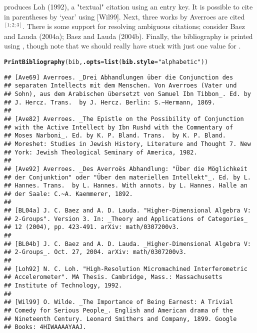 \documentclass[article]{jss}\usepackage[]{graphicx}\usepackage[]{color}
\makeatletter
\newcommand{\hlstr}[1]{\textcolor[rgb]{0.125,0.125,1}{#1}}%
\newcommand{\hlstd}[1]{\textcolor[rgb]{0.251,0.251,0.282}{#1}}%
\newcommand{\hlkwc}[1]{\textcolor[rgb]{0.529,0,0.184}{\textbf{#1}}}%
\newcommand{\hlkwd}[1]{\textcolor[rgb]{0.251,0.251,0.282}{\textbf{#1}}}%
\newenvironment{kframe}{%
 \def\at@end@of@kframe{}%
 \ifinner\ifhmode%
  \def\at@end@of@kframe{\end{minipage}}%
  \begin{minipage}{\columnwidth}%
 \fi\fi%
 \def\FrameCommand##1{\hskip\@totalleftmargin \hskip-\fboxsep
 \colorbox{shadecolor}{##1}\hskip-\fboxsep
     \hskip-\linewidth \hskip-\@totalleftmargin \hskip\columnwidth}%
 \MakeFramed {\advance\hsize-\width
   \@totalleftmargin\z@ \linewidth\hsize
   \@setminipage}}%
 {\par\unskip\endMakeFramed%
 \at@end@of@kframe}
\newenvironment{knitrout}{}{} %
\makeatother
\begin{document}
 produces Loh (1992), a "textual" citation using an entry key.  It is possible to cite in parentheses by `year' using  [Wil99].  Next, three works by Averroes are cited  $^{[1; 2; 3]}$.  There is some support for resolving ambiguous citations; consider  Baez and Lauda (2004a); Baez and Lauda (2004b).  Finally, the bibliography is printed using , though note that we should really have stuck with just one value for .
\begin{knitrout}
\color{fgcolor}\begin{kframe}
\begin{alltt}
\hlkwd{PrintBibliography}\hlstd{(bib,} \hlkwc{.opts} \hlstd{=} \hlkwd{list}\hlstd{(}\hlkwc{bib.style} \hlstd{=} \hlstr{"alphabetic"}\hlstd{))}
\end{alltt}
\begin{verbatim}
## [Ave69] Averroes. _Drei Abhandlungen über die Conjunction des
## separaten Intellects mit dem Menschen. Von Averroes (Vater und
## Sohn), aus dem Arabischen übersetzt von Samuel Ibn Tibbon_. Ed. by
## J. Hercz. Trans.  by J. Hercz. Berlin: S.~Hermann, 1869.
## 
## [Ave82] Averroes. _The Epistle on the Possibility of Conjunction
## with the Active Intellect by Ibn Rushd with the Commentary of
## Moses Narboni_. Ed. by K. P. Bland. Trans.  by K. P. Bland.
## Moreshet: Studies in Jewish History, Literature and Thought 7. New
## York: Jewish Theological Seminary of America, 1982.
## 
## [Ave92] Averroes. _Des Averroës Abhandlung: "Über die Möglichkeit
## der Conjunktion" oder "Über den materiellen Intellekt"_. Ed. by L.
## Hannes. Trans.  by L. Hannes. With annots. by L. Hannes. Halle an
## der Saale: C.~A. Kaemmerer, 1892.
## 
## [BL04a] J. C. Baez and A. D. Lauda. "Higher-Dimensional Algebra V:
## 2-Groups". Version 3. In: _Theory and Applications of Categories_
## 12 (2004), pp. 423-491. arXiv: math/0307200v3.
## 
## [BL04b] J. C. Baez and A. D. Lauda. _Higher-Dimensional Algebra V:
## 2-Groups_. Oct. 27, 2004. arXiv: math/0307200v3.
## 
## [Loh92] N. C. Loh. "High-Resolution Micromachined Interferometric
## Accelerometer". MA Thesis. Cambridge, Mass.: Massachusetts
## Institute of Technology, 1992.
## 
## [Wil99] O. Wilde. _The Importance of Being Earnest: A Trivial
## Comedy for Serious People_. English and American drama of the
## Nineteenth Century. Leonard Smithers and Company, 1899. Google
## Books: 4HIWAAAAYAAJ.
\end{verbatim}
\end{kframe}
\end{knitrout}
\end{document}
